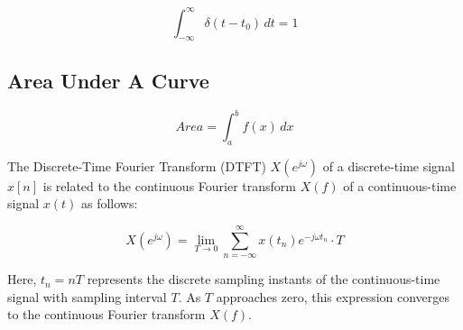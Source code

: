 \documentclass[a4paper]{article}
\begin{document}
$$
\int_{-\infty}^{\infty} \delta(t - t_0) \, dt = 1
$$

\newpage
\subsection{Area Under A Curve}
$$
Area = \int_{a}^{b} f(x) \, dx
$$
\begin{center}

\end{center}
  
The Discrete-Time Fourier Transform (DTFT) $X(e^{j\omega})$ of a discrete-time signal $x[n]$ is related to the continuous Fourier transform $X(f)$ of a continuous-time signal $x(t)$ as follows:

\[
X(e^{j\omega}) = \lim_{{T \to 0}} \sum_{{n=-\infty}}^{\infty} x(t_n)e^{-j\omega t_n} \cdot T
\]

Here, $t_n = nT$ represents the discrete sampling instants of the continuous-time signal with sampling interval $T$. As $T$ approaches zero, this expression converges to the continuous Fourier transform $X(f)$.


\newpage
\end{document}
